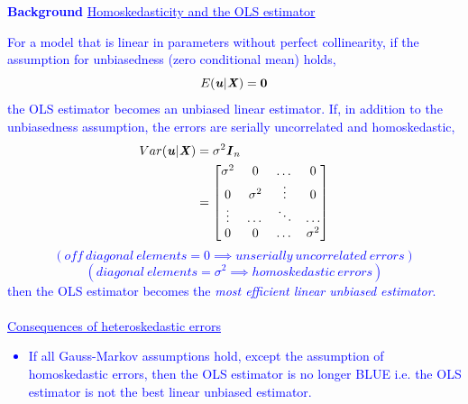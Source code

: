 \documentclass[12pt]{report}
\newenvironment{blueframed}[1][blue]
{\def\FrameCommand{\fboxsep=\FrameSep\fcolorbox{#1}{white}}%
\MakeFramed {\advance\hsize-\width \FrameRestore}}
{\endMakeFramed}
\begin{document}
\justify
\begin{blueframed}
	\textcolor{blue}{\textbf{Background}}
	\vspace{-\baselineskip}
	\justify
	\textcolor{blue}{\underline{Homoskedasticity and the OLS estimator}}
	
	\noindent \textcolor{blue}
	{
		For a model that is linear in parameters without perfect collinearity, if the assumption for unbiasedness (zero conditional mean) holds, $$E(\textbf{\textit{u}}|\textbf{\textit{X}}) = \textbf{0}$$ the OLS estimator becomes an unbiased linear estimator. If, in addition to the unbiasedness assumption, the errors are serially uncorrelated and homoskedastic, \begin{align*}
		Var(\textbf{\textit{u}}|\textbf{\textit{X}}) &= \sigma^2\textbf{\textit{I}}_n \\
		&=\begin{bmatrix}
		\sigma^2 & 0 & \dots & 0 \\
		0 & \sigma^2 & \vdots & 0 \\
		\vdots & \dots & \ddots & \dots \\
		0 & 0 & \dots & \sigma^2
		\end{bmatrix}
		\end{align*} $$(off\ diagonal\ elements = 0 \implies unserially\ uncorrelated\ errors)$$ $$(diagonal\ elements = \sigma^2 \implies homoskedastic\ errors)$$ then the OLS estimator becomes the \textit{most efficient linear unbiased estimator}. \\ \\ \uline{Consequences of heteroskedastic errors} \begin{itemize}
			\item If all Gauss-Markov assumptions hold, except the assumption of homoskedastic errors, then the OLS estimator is no longer BLUE i.e. the OLS estimator is not the best linear unbiased estimator.
		\end{itemize}  
	}
\end{blueframed}
\end{document}

